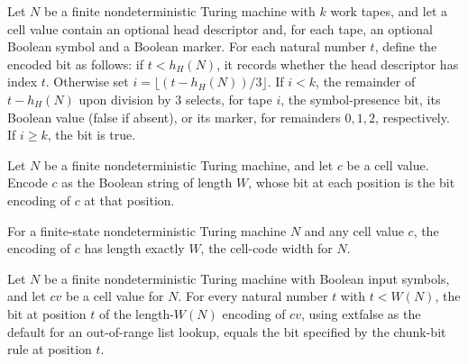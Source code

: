 \begin{definition}
\label{Complexity.Codec.chunkBit}
\leanok
{}
Let $N$ be a finite nondeterministic Turing machine with $k$ work tapes, and let a cell
value contain an optional head descriptor and, for each tape, an optional Boolean symbol
and a Boolean marker. For each natural number $t$, define the encoded bit as follows:
if $t<h_H(N)$, it records whether the head descriptor has index $t$. Otherwise set
$i=\lfloor(t-h_H(N))/3\rfloor$. If $i<k$, the remainder of $t-h_H(N)$ upon division
by $3$ selects, for tape $i$, the symbol-presence bit, its Boolean value (false if
absent), or its marker, for remainders $0,1,2$, respectively. If $i\ge k$,
the bit is true.
\end{definition}

\begin{definition}
\label{Complexity.Codec.encChunk}
\leanok
{}
Let $N$ be a finite nondeterministic Turing machine, and let $c$ be a cell value. Encode
$c$ as the Boolean string of length $W$, whose bit at each position is the bit encoding
of $c$ at that position.
\end{definition}

\begin{lemma}
\label{Complexity.Codec.length_encChunk}
\leanok
{}
For a finite-state nondeterministic Turing machine $N$ and any cell value $c$, the
encoding of $c$ has length exactly $W$, the cell-code width for $N$.
\end{lemma}

\begin{lemma}
\label{Complexity.Codec.getD_encChunk}
\leanok
{}
Let $N$ be a finite nondeterministic Turing machine with Boolean input symbols, and let
$cv$ be a cell value for $N$. For every natural number $t$ with $t<W(N)$, the bit at
position $t$ of the length-$W(N)$ encoding of $cv$, using 	ext{false} as the default for
an out-of-range list lookup, equals the bit specified by the chunk-bit rule at position
$t$.
\end{lemma}

